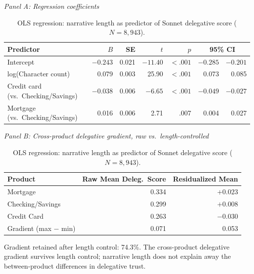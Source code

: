 
\begin{table}[H]
\centering
\begin{threeparttable}
\caption{OLS regression: narrative length as predictor of Sonnet delegative score ($N = 8{,}943$).}
\label{tab:supp_length_reg}
\begin{small}\centering
\textit{Panel A: Regression coefficients}

\medskip
\begin{tabular}{lrrrrrr}
\toprule
Predictor & $B$ & SE & $t$ & $p$ & \multicolumn{2}{c}{95\% CI} \\
\midrule
Intercept                             & $-0.243$ & 0.021 & $-11.40$ & $< .001$\rlap{***} & $-0.285$ & $-0.201$ \\
log(Character count)                  &    0.079 & 0.003 &   25.90  & $< .001$\rlap{***} &    0.073 &    0.085 \\
Credit card (vs.\ Checking/Savings)   & $-0.038$ & 0.006 & $-6.65$  & $< .001$\rlap{***} & $-0.049$ & $-0.027$ \\
Mortgage (vs.\ Checking/Savings)      &    0.016 & 0.006 &    2.71  &    .007\rlap{**}    &    0.004 &    0.027 \\
\bottomrule
\end{tabular}

\bigskip
\textit{Panel B: Cross-product delegative gradient, raw vs.\ length-controlled}

\medskip
\begin{tabular}{lrr}
\toprule
Product & Raw Mean Deleg.\ Score & Residualized Mean \\
\midrule
Mortgage         & 0.334 & $+0.023$ \\
Checking/Savings & 0.299 & $+0.008$ \\
Credit Card      & 0.263 & $-0.030$ \\
\midrule
Gradient (max $-$ min) & 0.071 & 0.053 \\
\bottomrule
\end{tabular}
\end{small}
\begin{tablenotes}
\small
\item Gradient retained after length control: 74.3\%. The cross-product delegative gradient survives length control; narrative length does not explain away the between-product differences in delegative trust.
\end{tablenotes}
\end{threeparttable}
\end{table}


